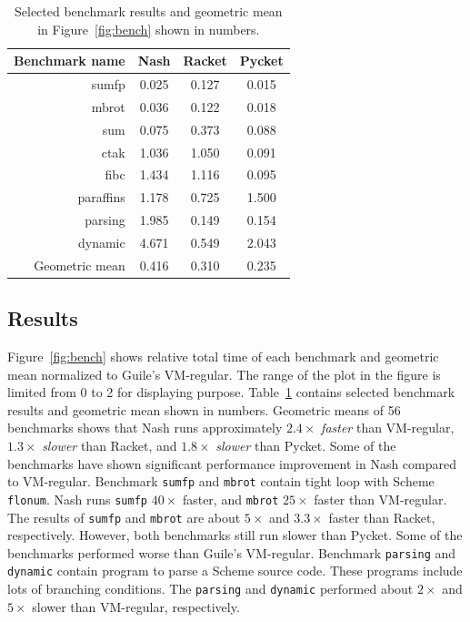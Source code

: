 \documentclass[preprint, 10pt]{sigplanconf}
\begin{document}
\begin{table}
  \centering
  \begin{tabular}{rccc}
    \toprule
    Benchmark name & Nash & Racket & Pycket\\
    \midrule
    sumfp & 0.025 & 0.127 & 0.015 \\
    mbrot & 0.036 & 0.122 & 0.018 \\
    sum & 0.075 & 0.373 & 0.088 \\
    \midrule
    ctak & 1.036 & 1.050 & 0.091 \\
    fibc & 1.434 & 1.116 & 0.095 \\
    \midrule
    paraffins & 1.178 & 0.725 & 1.500 \\
    parsing & 1.985 & 0.149 & 0.154 \\
    dynamic & 4.671 & 0.549 & 2.043 \\
    \midrule
    Geometric mean & 0.416 & 0.310 & 0.235 \\
    \bottomrule
  \end{tabular}
  \caption{Selected benchmark results and geometric mean in
    Figure~\hyperref[fig:bench]{\ref{fig:bench}} shown in numbers.}
\label{tab:bench}
\end{table}

\subsection{Results}

Figure~\ref{fig:bench} shows relative total time of each benchmark and geometric
mean normalized to Guile's VM-regular. The range of the plot in the figure is
limited from 0 to 2 for displaying
purpose. Table~\hyperref[tab:bench]{\ref{tab:bench}} contains selected benchmark
results and geometric mean shown in numbers.  Geometric means of 56 benchmarks
shows that Nash runs approximately $2.4\times$ \textit{faster} than VM-regular,
$1.3\times$ \textit{slower} than Racket, and $1.8\times$ \textit{slower} than
Pycket.  Some of the benchmarks have shown significant performance improvement
in Nash compared to VM-regular. Benchmark \texttt{sumfp} and \texttt{mbrot}
contain tight loop with Scheme \texttt{flonum}. Nash runs \texttt{sumfp}
$40\times$ faster, and \texttt{mbrot} $25\times$ faster than VM-regular. The
results of \texttt{sumfp} and \texttt{mbrot} are about $5\times$ and $3.3\times$
faster than Racket, respectively. However, both benchmarks still run slower than
Pycket.  Some of the benchmarks performed worse than Guile's
VM-regular. Benchmark \texttt{parsing} and \texttt{dynamic} contain program to
parse a Scheme source code. These programs include lots of branching
conditions. The \texttt{parsing} and \texttt{dynamic} performed about $2\times$
and $5\times$ slower than VM-regular, respectively.
\end{document}
